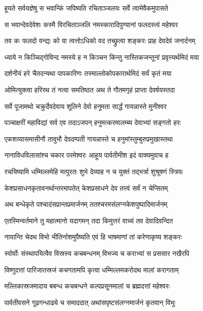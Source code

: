 \twolineshloka
{हूयते सर्वयज्ञेषु स भवान्किं जपिष्यति}
{रचिताञ्जलयः सर्वे त्वामेवैकमुपासते}%

\twolineshloka
{स भवान्देवदेवेशः कस्मै विरचिताञ्जलि}
{नमस्कारादिपुण्यानां फलदस्त्वं महेश्वर}%

\twolineshloka
{तव कः फलदो वन्द्यः को वा त्वत्तोऽधिको वद}
{तच्छ्रुत्वा शङ्करः प्राह देवदेवं जनार्दनम्}%

\twolineshloka
{ध्याये न किञ्चिद्गोविन्द नमस्ये ह न किञ्चन}
{किन्तु नास्तिकजन्तूनां प्रवृत्त्यर्थमिदं मया}%

\twolineshloka
{दर्शनीयं हरे चैतदन्यथा पापकारिणः}
{तस्माल्लोकोपकारार्थमिदं सर्वं कृतं मया}%

\twolineshloka
{ओमित्युक्त्वा हरिरथ तं नत्वा समतिष्ठत}
{अथ ते गौतमगृहं प्राप्ता देवर्षयस्तदा}%

\twolineshloka
{सर्वे पूजामथो चक्रुर्देवदेवाय शूलिने}
{देवो हनूमता सार्द्धं गायन्नास्ते मुनीश्वर}%

\twolineshloka
{पञ्चाक्षरीं महाविद्यां सर्व एव तदाऽजपन्}
{हनुमत्करमालम्ब्य देवाभ्यां सङ्गतो हरः}%

\twolineshloka
{एकशय्यासमासीनौ तावुभौ देवदम्पती}
{गायन्नास्ते च हनुमांस्तुम्बुरुप्रमुखास्तथा}%

\twolineshloka
{नानाविधविलासांश्च चकार परमेश्वरः}
{आहूय पार्वतीमीश इदं वाक्यमुवाच ह}%

\twolineshloka
{रचयिष्यामि धम्मिल्लमेहि मत्पुरतः शुभे}
{देव्याह न च युक्तं तद्भर्त्रा शुश्रूषणं स्त्रियः}%

\twolineshloka
{केशप्रसाधनकृतावनर्थान्तरमापतेत्}
{केशप्रसाधने देव तत्त्वं सर्वं न चेप्सितम्}%

\twolineshloka
{अथ बन्धेकृते पश्चादंसप्रान्तप्रमार्जनम्}
{ततश्चरमसंलग्नकेशपुष्पादिमार्जनम्}%

\twolineshloka
{एतस्मिन्वर्तमाने तु महात्मानो यदागमन्}
{तदा किमुत्तरं वाच्यं तव देवादिवन्दित}%

\twolineshloka
{नायान्ति चेदथ विभो भीतिर्नाशमुपैष्यति}
{एवं हि भाषमाणां तां करेणाकृष्य शङ्करः}%

\twolineshloka
{स्वोर्वोः संस्थापयित्वैव विस्रस्य कचबन्धनम्}
{विभज्य च कराभ्यां स प्रससार नखैरपि}%

\twolineshloka
{विष्णुदत्तां पारिजातस्रजं कचगतामपि}
{कृत्वा धम्मिल्लमकरोदथ मालां करागताम्}%

\twolineshloka
{मल्लिकास्रजमादाय बबन्ध कचबन्धने}
{कल्पप्रसूनमालां च ब्रह्मदत्तां महेश्वरः}%

\twolineshloka
{पार्वतीवसने गूढगन्धाढ्ये च समाददात्}
{अथांसपृष्टसंलग्नमार्जनं कृतवान् विभुः}%

